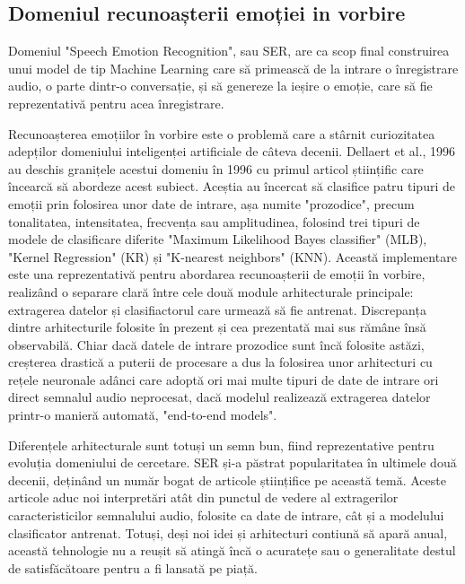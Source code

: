 \documentclass[a4paper,12pt]{book}
\begin{document}
			\subsection{Domeniul recunoașterii emoției in vorbire}
				Domeniul "Speech Emotion Recognition", sau SER, are ca scop final construirea unui model de tip Machine Learning care să primească de la intrare o înregistrare audio, o parte dintr-o conversație, și să genereze la ieșire o emoție, care să fie reprezentativă pentru acea înregistrare. \par
				Recunoașterea emoțiilor în vorbire este o problemă care a stârnit curiozitatea adepților domeniului inteligenței artificiale de câteva decenii. Dellaert et al., 1996 \cite{dellaert} au deschis granițele acestui domeniu în 1996 cu primul articol științific care încearcă să abordeze acest subiect. Aceștia au încercat să clasifice patru tipuri de emoții prin folosirea unor date de intrare, așa numite "prozodice", precum tonalitatea, intensitatea, frecvența sau amplitudinea, folosind trei tipuri de modele de clasificare diferite "Maximum Likelihood Bayes classifier" (MLB), "Kernel Regression"  (KR) și "K-nearest neighbors" (KNN). Această implementare este una reprezentativă pentru abordarea recunoașterii de emoții în vorbire, realizând o separare clară între cele două module arhitecturale principale: extragerea datelor și clasifiactorul care urmează să fie antrenat. Discrepanța dintre arhitecturile folosite în prezent și cea prezentată mai sus rămâne însă observabilă. Chiar dacă datele de intrare prozodice sunt încă folosite astăzi, creșterea drastică a puterii de procesare a dus la folosirea unor arhitecturi cu rețele neuronale adânci care adoptă ori mai multe tipuri de date de intrare ori direct semnalul audio neprocesat, dacă modelul realizează extragerea datelor printr-o manieră automată, "end-to-end models". \par		
				
				Diferențele arhitecturale sunt totuși un semn bun, fiind reprezentative pentru evoluția domeniului de cercetare. SER și-a păstrat popularitatea în ultimele două decenii, deținând un număr bogat de articole științifice pe această temă. Aceste articole aduc noi interpretări atât din punctul de vedere al extragerilor caracteristicilor semnalului audio, folosite ca date de intrare, cât și a modelului clasificator antrenat. Totuși, deși noi idei și arhitecturi contiună să apară anual, această tehnologie nu a reușit să atingă încă o acuratețe sau o generalitate destul de satisfăcătoare pentru a fi lansată pe piață. \par
				
\end{document}
